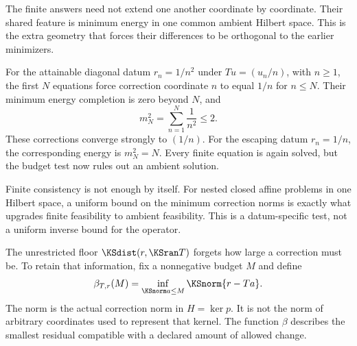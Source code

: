 The finite answers need not extend one another coordinate by coordinate. Their shared feature is minimum energy in one common ambient Hilbert space. This is the extra geometry that forces their differences to be orthogonal to the earlier minimizers.

For the attainable diagonal datum $r_n=1/n^2$ under $Tu=(u_n/n)$, with $n\ge1$, the first $N$ equations force correction coordinate $n$ to equal $1/n$ for $n\le N$. Their minimum energy completion is zero beyond $N$, and
\[
 m_N^2=\sum_{n=1}^{N}\frac1{n^2}\le2.
\]
These corrections converge strongly to $(1/n)$. For the escaping datum $r_n=1/n$, the corresponding energy is $m_N^2=N$. Every finite equation is again solved, but the budget test now rules out an ambient solution.


\begin{insight}
Finite consistency is not enough by itself. For nested closed affine problems in one Hilbert space, a uniform bound on the minimum correction norms is exactly what upgrades finite feasibility to ambient feasibility. This is a datum-specific test, not a uniform inverse bound for the operator.
\end{insight}



\label{KS:sec:budget-frontier}
The unrestricted floor $\KSdist(r,\KSran T)$ forgets how large a correction must be. To retain that information, fix a nonnegative budget $M$ and define
\[
 \beta_{T,r}(M)=\inf_{\KSnorm a\le M}\KSnorm{r-Ta}.
\]
The norm is the actual correction norm in $H=\ker p$. It is not the norm of arbitrary coordinates used to represent that kernel. The function $\beta$ describes the smallest residual compatible with a declared amount of allowed change.

